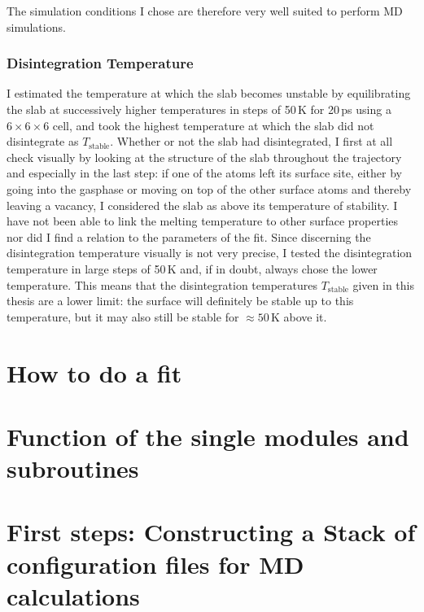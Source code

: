 \documentclass[twoside, 11pt, titlepage, captions=nooneline, a4paper, headsepline]{scrbook}%
\begin{document}
The simulation conditions I chose are therefore very well suited to perform MD simulations.

\subsection{Disintegration Temperature}
I estimated the temperature at which the slab becomes unstable by equilibrating the slab at successively higher temperatures in steps of 50\,K for 20\,ps using a $6\times6\times6$ cell, and took the highest temperature at which the slab did not disintegrate as $T_\mathrm{stable}$. Whether or not the slab had disintegrated, I first at all check visually by looking at the structure of the slab throughout the trajectory and especially in the last step: if one of the atoms left its surface site, either by going into the gasphase or moving on top of the other surface atoms and thereby leaving a vacancy, I considered the slab as above its temperature of stability. I have not been able to link the melting temperature to other surface properties nor did I find a relation to the parameters of the fit. Since discerning the disintegration temperature visually is not very precise, I tested the disintegration temperature in large steps of 50\,K and, if in doubt, always chose the lower temperature. This means that the disintegration temperatures $T_\mathrm{stable}$ given in this thesis are a lower limit: the surface will definitely be stable up to this temperature, but it may also still be stable for $\approx 50$\,K above it. 



\chapter{How to do a fit}

\chapter{Function of the single modules and subroutines}

\chapter{First steps: Constructing a Stack of configuration files for MD calculations}


\end{document}
